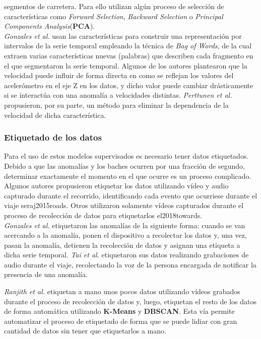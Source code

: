 			segmentos de carretera. Para ello utilizan algún proceso de selección de características como \emph{Forward Selection}, \emph{Backward Selection}
			o \emph{Principal Components Analysis}(\textbf{PCA}).\\
			\indent \emph{Gonzales et al.} usan las características para construir una representación por intervalos de la serie
			temporal empleando la técnica de \emph{Bag of Words}, de la cual extraen varias características nuevas (palabras) que describen cada fragmento
			en el que segmentaron la serie temporal. Algunos de los autores plantearon que la velocidad puede influir de forma directa en como se reflejan
			los valores del acelerómetro en el eje Z en los datos, y dicho valor puede cambiar drásticamente si se interactúa con una anomalía a velocidades
			distintas. \emph{Perttunen et al.}
			propusieron, por su parte, un método para eliminar la dependencia de la velocidad de dicha característica. 

		\subsubsection{Etiquetado de los datos}
			Para el uso de estos modelos supervisados es necesario tener datos etiquetados. Debido a que las anomalías y los baches ocurren por una 
			fracción de segundo, determinar exactamente el momento en el que ocurre es un proceso complicado. Algunos autores propusieron etiquetar
			los datos utilizando vídeo y audio capturado durante el recorrido, identificando cada evento que ocurriese durante el viaje\brackcite
			{seraj2015roads}. Otros utilizaron solamente vídeos capturados durante el proceso de recolección de datos para etiquetarlos\brackcite
			{el2018towards}.\\
			\indent \emph{Gonzales et al.} etiquetaron las anomalías de la siguiente forma: cuando se van acercando a la
			anomalía, ponen el dispositivo a recolectar los datos y, una vez, pasan la anomalía, detienen la recolección de datos y asignan una etiqueta
			a dicha serie temporal. \emph{Tai et al.} etiquetaron sus datos realizando grabaciones de audio durante el
			viaje, recolectando la voz de la persona encargada de notificar la presencia de una anomalía.

			\emph{Ranjith et al.} etiquetan a mano unos pocos datos utilizando vídeos grabados durante el proceso
			de recolección de datos y, luego, etiquetan el resto de los datos de forma automática utilizando \textbf{K-Means} y \textbf{DBSCAN}. Esta vía 
			permite automatizar el proceso de etiquetado de forma que se puede lidiar con gran cantidad de datos sin tener que etiquetarlos a mano.


